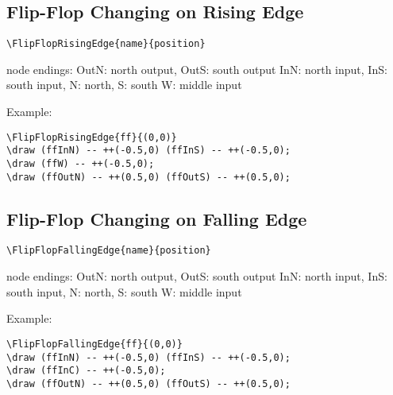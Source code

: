 \documentclass[parskip=full]{scrartcl}
\begin{document}
\subsection{Flip-Flop Changing on Rising Edge}

\begin{verbatim}
\FlipFlopRisingEdge{name}{position}
\end{verbatim}
node endings: OutN: north output, OutS: south output
              InN: north input, InS: south input,
              N: north, S: south
              W: middle input

Example:\\
\begin{minipage}{0.8\textwidth}
\begin{verbatim}
\FlipFlopRisingEdge{ff}{(0,0)}
\draw (ffInN) -- ++(-0.5,0) (ffInS) -- ++(-0.5,0);
\draw (ffW) -- ++(-0.5,0);
\draw (ffOutN) -- ++(0.5,0) (ffOutS) -- ++(0.5,0);
\end{verbatim}
\end{minipage}
\begin{minipage}{0.19\textwidth}
\end{minipage}

\subsection{Flip-Flop Changing on Falling Edge}

\begin{verbatim}
\FlipFlopFallingEdge{name}{position}
\end{verbatim}
node endings: OutN: north output, OutS: south output
              InN: north input, InS: south input,
              N: north, S: south
              W: middle input

Example:\\
\begin{minipage}{0.8\textwidth}
\begin{verbatim}
\FlipFlopFallingEdge{ff}{(0,0)}
\draw (ffInN) -- ++(-0.5,0) (ffInS) -- ++(-0.5,0);
\draw (ffInC) -- ++(-0.5,0);
\draw (ffOutN) -- ++(0.5,0) (ffOutS) -- ++(0.5,0);
\end{verbatim}
\end{minipage}
\begin{minipage}{0.19\textwidth}
\end{minipage}
\end{document}
